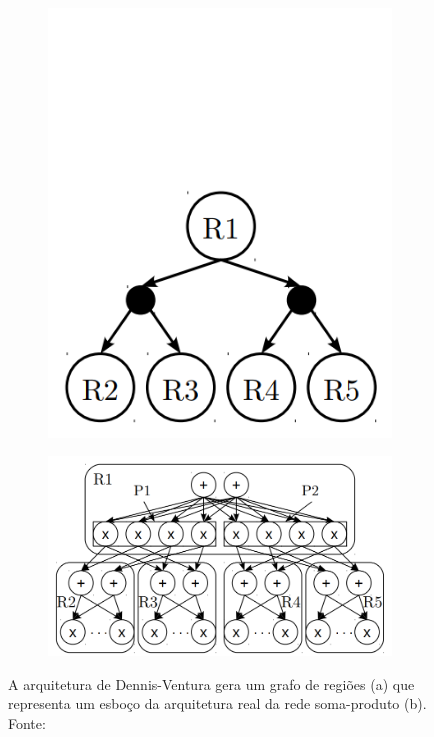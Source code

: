 \documentclass[12pt]{article}
\theoremstyle{plain}
\numberwithin{equation}{section}
\begin{document}
\begin{figure}[h]
  \begin{subfigure}{.4\linewidth}
    \centering\includegraphics[scale=1.0]{imgs/simple_dv.png}
    \caption{}
  \end{subfigure}
  \begin{subfigure}{.6\linewidth}
    \centering\includegraphics[scale=1.0]{imgs/trans_dv.png}
    \caption{}
  \end{subfigure}
  \captionsetup{justification=raggedright}
  \caption{A arquitetura de Dennis-Ventura gera um grafo de regiões (a) que representa um esboço da
    arquitetura real da rede soma-produto (b). Fonte:~\cite{clustering}}
\end{figure}
\end{document}
